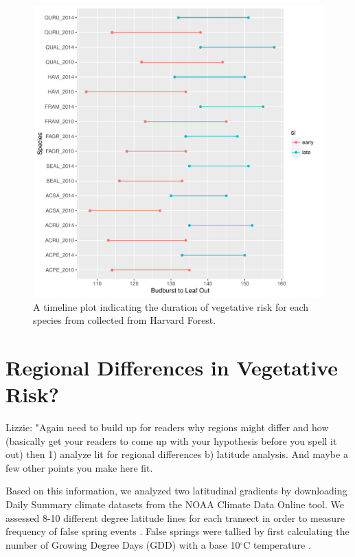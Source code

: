 \documentclass{article}\usepackage[]{graphicx}\usepackage[]{color}
\makeatletter
\def\maxwidth{ %
  \ifdim\Gin@nat@width>\linewidth
    \linewidth
  \else
    \Gin@nat@width
  \fi
}
\makeatother
\begin{document}
\begin{figure}[H]
\includegraphics[width=\maxwidth]{figure/forest-1} \caption[A timeline plot indicating the duration of vegetative risk for each species from collected from Harvard Forest]{A timeline plot indicating the duration of vegetative risk for each species from collected from Harvard Forest.}\label{fig:forest}
\end{figure}




\section*{Regional Differences in Vegetative Risk?}
Lizzie: "Again need to build up for readers why regions might differ and how (basically get your readers to come up with your hypothesis before you spell it out) then 1) analyze lit for regional differences b) latitude analysis. And maybe a few other points you make here fit.

Based on this information, we analyzed two latitudinal gradients by downloading Daily Summary climate datasets from the NOAA Climate Data Online tool. We assessed 8-10 different degree latitude lines for each transect in order to measure frequency of false spring events \citep{Menne2012, Menne2012b}. False springs were tallied by first calculating the number of Growing Degree Days (GDD) with a base 10$^{\circ}$C temperature \citep{Nugent2005}.
\end{document}

